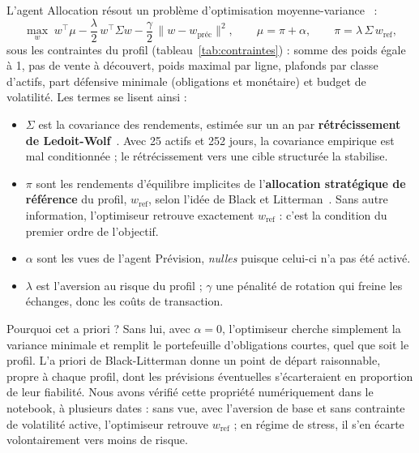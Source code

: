 L'agent Allocation résout un problème d'optimisation moyenne-variance~\cite{markowitz1952} :
\begin{equation}
  \max_{w}\; w^\top\mu - \frac{\lambda}{2}\,w^\top\Sigma w - \frac{\gamma}{2}\,\lVert w - w_{\text{préc}}\rVert^2,
  \qquad \mu = \pi + \alpha, \qquad \pi = \lambda\,\Sigma\,w_{\text{ref}},
\end{equation}
sous les contraintes du profil (tableau~\ref{tab:contraintes}) : somme des poids égale à 1, pas de vente à découvert, poids maximal par ligne, plafonds par classe d'actifs, part défensive minimale (obligations et monétaire) et budget de volatilité. Les termes se lisent ainsi :
\begin{itemize}
  \item $\Sigma$ est la covariance des rendements, estimée sur un an par \textbf{rétrécissement de Ledoit-Wolf}~\cite{ledoit2004}. Avec 25 actifs et 252 jours, la covariance empirique est mal conditionnée ; le rétrécissement vers une cible structurée la stabilise.
  \item $\pi$ sont les rendements \og d'équilibre \fg{} implicites de l'\textbf{allocation stratégique de référence} du profil, $w_{\text{ref}}$, selon l'idée de Black et Litterman~\cite{black1992}. Sans autre information, l'optimiseur retrouve exactement $w_{\text{ref}}$ : c'est la condition du premier ordre de l'objectif.
  \item $\alpha$ sont les vues de l'agent Prévision, \emph{nulles} puisque celui-ci n'a pas été activé.
  \item $\lambda$ est l'aversion au risque du profil ; $\gamma$ une pénalité de rotation qui freine les échanges, donc les coûts de transaction.
\end{itemize}

Pourquoi cet a priori ? Sans lui, avec $\alpha = 0$, l'optimiseur cherche simplement la variance minimale et remplit le portefeuille d'obligations courtes, quel que soit le profil. L'a priori de Black-Litterman donne un point de départ raisonnable, propre à chaque profil, dont les prévisions éventuelles s'écarteraient en proportion de leur fiabilité. Nous avons vérifié cette propriété numériquement dans le notebook, à plusieurs dates : sans vue, avec l'aversion de base et sans contrainte de volatilité active, l'optimiseur retrouve $w_{\text{ref}}$ ; en régime de stress, il s'en écarte volontairement vers moins de risque.

